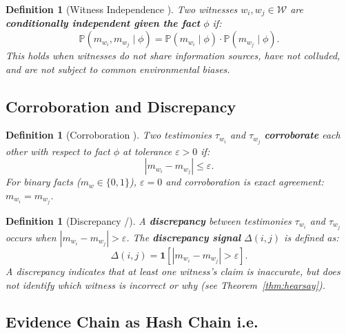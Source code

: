 \documentclass[11pt,a4paper]{article}
\newtheorem{definition}[theorem]{Definition}
\theoremstyle{definition}
\newcommand{\Pbb}{\mathbb{P}}
\newcommand{\ind}[1]{\mathbf{1}[#1]}
\newcommand{\abs}[1]{\left|#1\right|}
\newcommand{\witnessSet}{\mathcal{W}}           %
\newcommand{\fact}{\phi}                        %
\newcommand{\discrepancy}{\Delta}              %
\begin{document}
\begin{definition}[Witness Independence ]
\label{def:independence}
Two witnesses $w_i, w_j \in \witnessSet$ are \textbf{conditionally independent given the fact} $\fact$ if:
\begin{equation}
    \Pbb(m_{w_i}, m_{w_j} \mid \fact) = \Pbb(m_{w_i} \mid \fact) \cdot \Pbb(m_{w_j} \mid \fact).
    \label{eq:witness_independence}
\end{equation}
This holds when witnesses do not share information sources, have not colluded, and are not subject to common environmental biases.
\end{definition}

\subsection{Corroboration and Discrepancy }

\begin{definition}[Corroboration ]
\label{def:corroboration}
Two testimonies $\tau_{w_i}$ and $\tau_{w_j}$ \textbf{corroborate} each other with respect to fact $\fact$ at tolerance $\varepsilon > 0$ if:
\begin{equation}
    \abs{m_{w_i} - m_{w_j}} \leq \varepsilon.
    \label{eq:corroboration}
\end{equation}
For binary facts ($m_w \in \{0, 1\}$), $\varepsilon = 0$ and corroboration is exact agreement: $m_{w_i} = m_{w_j}$.
\end{definition}

\begin{definition}[Discrepancy /]
\label{def:discrepancy}
A \textbf{discrepancy} between testimonies $\tau_{w_i}$ and $\tau_{w_j}$ occurs when $\abs{m_{w_i} - m_{w_j}} > \varepsilon$. The \textbf{discrepancy signal} $\discrepancy(i, j)$ is defined as:
\begin{equation}
    \discrepancy(i, j) = \ind{\abs{m_{w_i} - m_{w_j}} > \varepsilon}.
    \label{eq:discrepancy}
\end{equation}
A discrepancy indicates that at least one witness's claim is inaccurate, but does not identify \textit{which} witness is incorrect or \textit{why} (see Theorem~\ref{thm:hearsay}).
\end{definition}

\subsection{Evidence Chain as Hash Chain i.e.}
\end{document}
